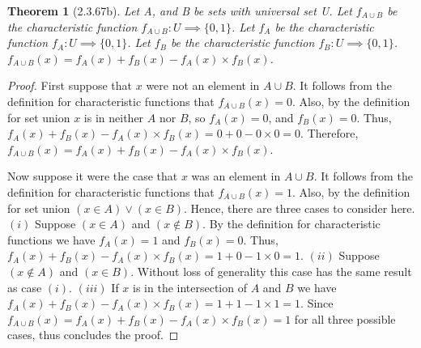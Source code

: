 \documentclass[a4paper, 12pt]{article}
\theoremstyle{plain}
\newtheorem*{theorem*}{Theorem}
\begin{document}
	
	\begin{theorem*}[2.3.67b]
		Let A, and B be sets with universal set U. Let $f_{A \cup B}$ be the characteristic function $f_{A \cup B}: U \implies \{0, 1\}$. Let $f_{A}$ be the characteristic function $f_{A}: U \implies \{0, 1\}$. Let $f_{B}$ be the characteristic function \newline $f_{B}: U \implies \{0, 1\}$. \newline $f_{A \cup B}(x) = f_{A}(x) + f_{B}(x) - f_{A}(x) \times f_{B}(x)$.
	\end{theorem*}
	
	\begin{proof}
		First suppose that $x$ were not an element in $A \cup B$. It follows from the definition for characteristic functions that $f_{A \cup B}(x) = 0$. Also, by the definition for set union $x$ is in neither $A$ nor $B$, so $f_{A}(x) = 0$, and $f_{B}(x) = 0$. Thus, $f_{A}(x) + f_{B}(x) - f_{A}(x) \times f_{B}(x) = 0 + 0 - 0 \times 0 = 0$. Therefore, $f_{A \cup B}(x) = f_{A}(x) + f_{B}(x) - f_{A}(x) \times f_{B}(x)$.
		
		Now suppose it were the case that $x$ was an element in $A \cup B$. It follows from the definition for characteristic functions that $f_{A \cup B}(x) = 1$. Also, by the definition for set union $(x \in A) \lor (x \in B)$. Hence, there are three cases to consider here. \newline \newline \indent $(i)$ Suppose $(x \in A)$ and $(x \notin B)$. By the definition for characteristic \indent functions we have $f_{A}(x) = 1$ and $f_{B}(x) = 0$. Thus, \newline \indent $f_{A}(x) + f_{B}(x) - f_{A}(x) \times f_{B}(x) = 1 + 0 - 1 \times 0 = 1$. \newline \newline \indent $(ii)$ Suppose $(x \notin A)$ and $(x \in B)$. Without loss of generality this case \indent has the same result as case $(i)$. \newline \newline \indent $(iii)$ If $x$ is in the intersection of $A$ and $B$ we have \newline \indent $f_{A}(x) + f_{B}(x) - f_{A}(x) \times f_{B}(x) = 1 + 1 - 1 \times 1 = 1$. \newline \newline Since $f_{A \cup B}(x) = f_{A}(x) + f_{B}(x) - f_{A}(x) \times f_{B}(x) = 1$ for all three possible cases, thus concludes the proof.
	\end{proof}
\end{document}

